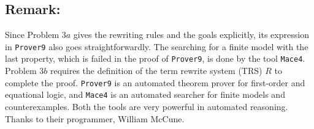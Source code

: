 \subsection*{Remark:}

Since Problem 3$a$ gives the rewriting rules and the goals explicitly, its expression in {\tt Prover9} also goes straightforwardly. The searching for a finite model with the last property, which is failed in the proof of {\tt Prover9}, is done by the tool {\tt Mace4}. Problem 3$b$ requires the definition of the term rewrite system (TRS) $R$ to complete the proof. {\tt Prover9} is an automated theorem prover for first-order and equational logic, and {\tt Mace4} is an automated searcher for finite models and counterexamples. Both the tools are very powerful in automated reasoning. Thanks to their programmer, William McCune.





